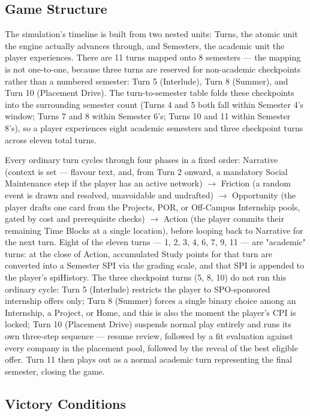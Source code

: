\subsection{Game Structure}

The simulation's timeline is built from two nested units: Turns, the atomic unit the engine actually advances through, and Semesters, the academic unit the player experiences. There are 11 turns mapped onto 8 semesters --- the mapping is not one-to-one, because three turns are reserved for non-academic checkpoints rather than a numbered semester: Turn 5 (Interlude), Turn 8 (Summer), and Turn 10 (Placement Drive). The turn-to-semester table folds these checkpoints into the surrounding semester count (Turns 4 and 5 both fall within Semester 4's window; Turns 7 and 8 within Semester 6's; Turns 10 and 11 within Semester 8's), so a player experiences eight academic semesters and three checkpoint turns across eleven total turns.

Every ordinary turn cycles through four phases in a fixed order: Narrative (context is set --- flavour text, and, from Turn 2 onward, a mandatory Social Maintenance step if the player has an active network) $\rightarrow$ Friction (a random event is drawn and resolved, unavoidable and undrafted) $\rightarrow$ Opportunity (the player drafts one card from the Projects, POR, or Off-Campus Internship pools, gated by cost and prerequisite checks) $\rightarrow$ Action (the player commits their remaining Time Blocks at a single location), before looping back to Narrative for the next turn. Eight of the eleven turns --- 1, 2, 3, 4, 6, 7, 9, 11 --- are "academic" turns: at the close of Action, accumulated Study points for that turn are converted into a Semester SPI via the grading scale, and that SPI is appended to the player's spiHistory. The three checkpoint turns (5, 8, 10) do not run this ordinary cycle: Turn 5 (Interlude) restricts the player to SPO-sponsored internship offers only; Turn 8 (Summer) forces a single binary choice among an Internship, a Project, or Home, and this is also the moment the player's CPI is locked; Turn 10 (Placement Drive) suspends normal play entirely and runs its own three-step sequence --- resume review, followed by a fit evaluation against every company in the placement pool, followed by the reveal of the best eligible offer. Turn 11 then plays out as a normal academic turn representing the final semester, closing the game.

\subsection{Victory Conditions}

